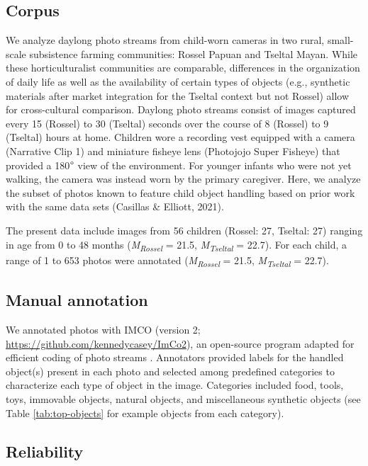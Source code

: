 \documentclass[10pt, letterpaper]{article}
\begin{document}
\hypertarget{corpus}{%
\subsection{Corpus}\label{corpus}}

We analyze daylong photo streams from child-worn cameras in two rural,
small-scale subsistence farming communities: Rossel Papuan and Tseltal
Mayan. While these horticulturalist communities are comparable,
differences in the organization of daily life as well as the
availability of certain types of objects (e.g., synthetic materials
after market integration for the Tseltal context but not Rossel) allow
for cross-cultural comparison. Daylong photo streams consist of images
captured every 15 (Rossel) to 30 (Tseltal) seconds over the course of 8
(Rossel) to 9 (Tseltal) hours at home. Children wore a recording vest
equipped with a camera (Narrative Clip 1) and miniature fisheye lens
(Photojojo Super Fisheye) that provided a 180\(\text{\textdegree}\) view
of the environment. For younger infants who were not yet walking, the
camera was instead worn by the primary caregiver. Here, we analyze the
subset of photos known to feature child object handling based on prior
work with the same data sets (Casillas \& Elliott, 2021).

The present data include images from 56 children (Rossel: 27, Tseltal:
27) ranging in age from 0 to 48 months
(\emph{M}\textsubscript{\emph{Rossel}} = 21.5,
\emph{M}\textsubscript{\emph{Tseltal}} = 22.7). For each child, a range
of 1 to 653 photos were annotated (\emph{M}\textsubscript{\emph{Rossel}}
= 21.5, \emph{M}\textsubscript{\emph{Tseltal}} = 22.7).

\hypertarget{manual-annotation}{%
\subsection{Manual annotation}\label{manual-annotation}}

We annotated photos with IMCO (version 2;
\url{https://github.com/kennedycasey/ImCo2}), an open-source program
adapted for efficient coding of photo streams . Annotators provided
labels for the handled object(s) present in each photo and selected
among predefined categories to characterize each type of object in the
image. Categories included food, tools, toys, immovable objects, natural
objects, and miscellaneous synthetic objects (see Table
\ref{tab:top-objects} for example objects from each category).

\hypertarget{reliability}{%
\subsection{Reliability}\label{reliability}}
\end{document}
